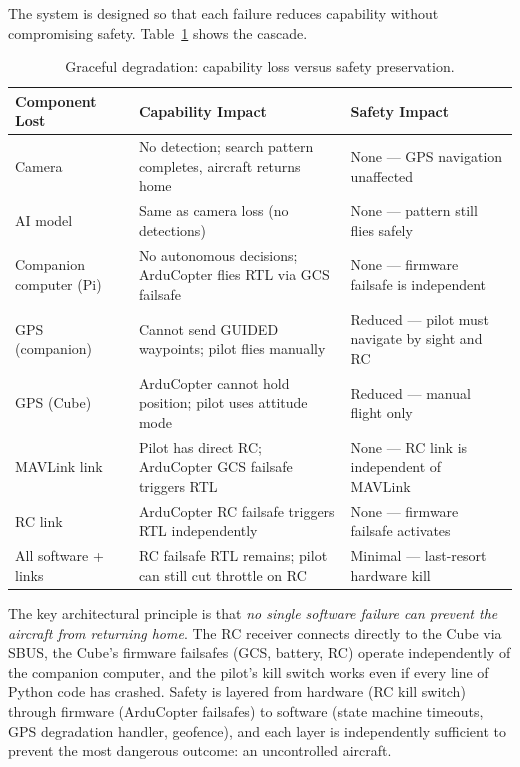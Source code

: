 The system is designed so that each failure reduces capability without compromising safety.  Table~\ref{tab:degradation} shows the cascade.

\begin{table}[htbp]
  \centering\small
  \caption{Graceful degradation: capability loss versus safety preservation.}\label{tab:degradation}
  \begin{tabularx}{\linewidth}{@{}p{3.2cm}p{4.2cm}X@{}}
    \toprule
    \textbf{Component Lost} & \textbf{Capability Impact} & \textbf{Safety Impact} \\
    \midrule
    Camera & No detection; search pattern completes, aircraft returns home & None --- GPS navigation unaffected \\
    AI model & Same as camera loss (no detections) & None --- pattern still flies safely \\
    Companion computer (Pi) & No autonomous decisions; ArduCopter flies RTL via GCS failsafe & None --- firmware failsafe is independent \\
    GPS (companion) & Cannot send GUIDED waypoints; pilot flies manually & Reduced --- pilot must navigate by sight and RC \\
    GPS (Cube) & ArduCopter cannot hold position; pilot uses attitude mode & Reduced --- manual flight only \\
    MAVLink link & Pilot has direct RC; ArduCopter GCS failsafe triggers RTL & None --- RC link is independent of MAVLink \\
    RC link & ArduCopter RC failsafe triggers RTL independently & None --- firmware failsafe activates \\
    All software + links & RC failsafe RTL remains; pilot can still cut throttle on RC & Minimal --- last-resort hardware kill \\
    \bottomrule
  \end{tabularx}
\end{table}

The key architectural principle is that \emph{no single software failure can prevent the aircraft from returning home}.  The RC receiver connects directly to the Cube via SBUS, the Cube's firmware failsafes (GCS, battery, RC) operate independently of the companion computer, and the pilot's kill switch works even if every line of Python code has crashed.  Safety is layered from hardware (RC kill switch) through firmware (ArduCopter failsafes) to software (state machine timeouts, GPS degradation handler, geofence), and each layer is independently sufficient to prevent the most dangerous outcome: an uncontrolled aircraft.

